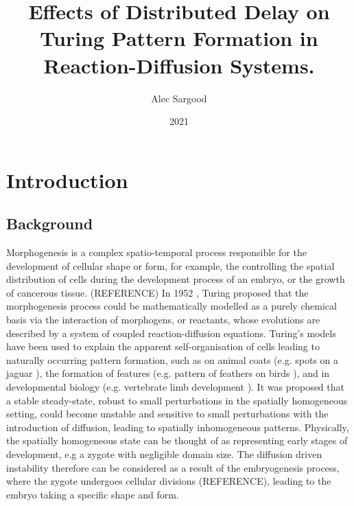 \documentclass[12pt,a4paper]{report}
\title{Effects of Distributed Delay on Turing Pattern Formation in Reaction-Diffusion Systems.}
\author{Alec Sargood}
\begin{document}
\date{2021}
\maketitle

\tableofcontents
\newpage
\chapter{Introduction}

\section{Background}

Morphogenesis is a complex spatio-temporal process responsible for the development of cellular shape or form, for example, the controlling the spatial distribution of cells during the development process of an embryo, or the growth of cancerous tissue. (REFERENCE) In 1952 \cite{turing}, Turing proposed that the morphogenesis process could be mathematically modelled as a purely chemical basis via the interaction of morphogens, or reactants, whose evolutions are described by a system of coupled reaction-diffusion equations. Turing's models have been used to explain the apparent self-organisation of cells leading to naturally occurring pattern formation, such as on animal coats (e.g. spots on a jaguar \cite{painter}), the formation of features (e.g. pattern of feathers on birds \cite{bailleul}), and in developmental biology (e.g. vertebrate limb development \cite{miura1,glimm,miura2}). It was proposed that a stable steady-state, robust to small perturbations in the spatially homogeneous setting, could become unstable and sensitive to small perturbations with the introduction of diffusion, leading to spatially inhomogeneous patterns. Physically, the spatially homogeneous state can be thought of as representing early stages of development, e.g a zygote with negligible domain size. The diffusion driven instability therefore can be considered as a result of the embryogenesis process, where the zygote undergoes cellular divisions (REFERENCE), leading to the embryo taking a specific shape and form.
\\
\end{document}
